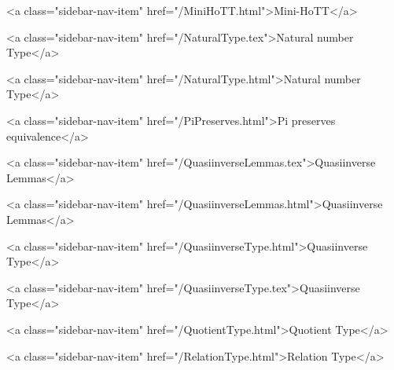       
    
      
        
      
    
      
        
          <a class="sidebar-nav-item" href="/MiniHoTT.html">Mini-HoTT</a>
        
      
    
      
        
          <a class="sidebar-nav-item" href="/NaturalType.tex">Natural number Type</a>
        
      
    
      
        
          <a class="sidebar-nav-item" href="/NaturalType.html">Natural number Type</a>
        
      
    
      
        
          <a class="sidebar-nav-item" href="/PiPreserves.html">Pi preserves equivalence</a>
        
      
    
      
        
          <a class="sidebar-nav-item" href="/QuasiinverseLemmas.tex">Quasiinverse Lemmas</a>
        
      
    
      
        
          <a class="sidebar-nav-item" href="/QuasiinverseLemmas.html">Quasiinverse Lemmas</a>
        
      
    
      
        
          <a class="sidebar-nav-item" href="/QuasiinverseType.html">Quasiinverse Type</a>
        
      
    
      
        
          <a class="sidebar-nav-item" href="/QuasiinverseType.tex">Quasiinverse Type</a>
        
      
    
      
        
          <a class="sidebar-nav-item" href="/QuotientType.html">Quotient Type</a>
        
      
    
      
        
          <a class="sidebar-nav-item" href="/RelationType.html">Relation Type</a>
        
      
    
      
        
